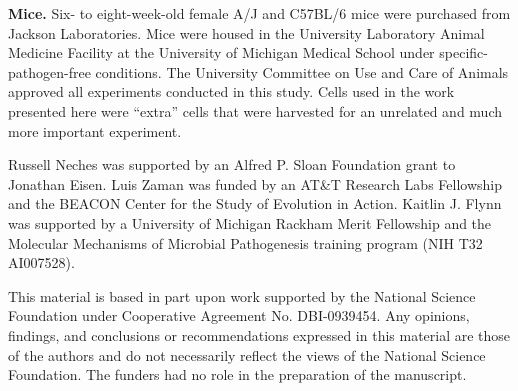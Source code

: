 \documentclass[fleqn,10pt]{wlpeerj}
\begin{document}
{\bf Mice.} Six- to eight-week-old female A/J and C57BL/6 mice were purchased from Jackson Laboratories. Mice were housed in the University Laboratory Animal Medicine Facility at the University of Michigan Medical School under specific-pathogen-free conditions. The University Committee on Use and Care of Animals approved all experiments conducted in this study. Cells used in the work presented here were ``extra'' cells that were harvested for an unrelated and much more important experiment.

 Russell Neches was supported by an Alfred P. Sloan Foundation grant to Jonathan Eisen. Luis Zaman was funded by an AT\&T Research Labs Fellowship and the BEACON Center for the Study of Evolution in Action. Kaitlin J. Flynn was supported by a University of Michigan Rackham Merit Fellowship and the Molecular Mechanisms of Microbial Pathogenesis training program (NIH T32 AI007528).

\noindent This material is based in part upon work supported by the National Science Foundation under Cooperative Agreement No. DBI-0939454. Any opinions, findings, and conclusions or recommendations expressed in this material are those of the authors and do not necessarily reflect the views of the National Science Foundation. The funders had no role in the preparation of the manuscript.



\end{document}
